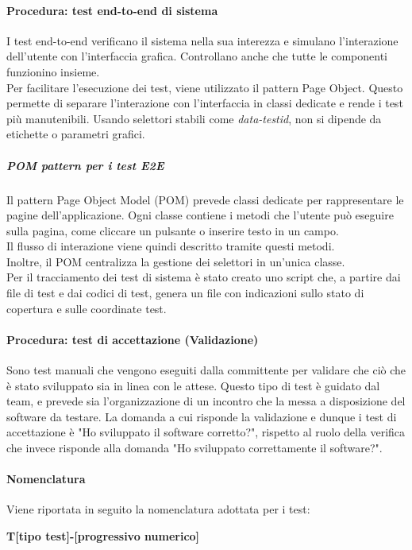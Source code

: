 \documentclass[a4paper,12pt]{article}
\begin{document}
\paragraph{Procedura: test end-to-end di sistema}
I test end-to-end verificano il sistema nella sua interezza e simulano l'interazione dell'utente con l'interfaccia grafica. Controllano anche che tutte le componenti funzionino insieme.\\
Per facilitare l'esecuzione dei test, viene utilizzato il pattern Page Object. Questo permette di separare l'interazione con l'interfaccia in classi dedicate e rende i test più manutenibili.
Usando selettori stabili come \textit{data-testid}, non si dipende da etichette o parametri grafici.
\subparagraph{POM pattern per i test E2E}
Il pattern Page Object Model (POM) prevede classi dedicate per rappresentare le pagine dell'applicazione. 
Ogni classe contiene i metodi che l'utente può eseguire sulla pagina, come cliccare un pulsante o inserire testo in un campo.\\
Il flusso di interazione viene quindi descritto tramite questi metodi.\\
Inoltre, il POM centralizza la gestione dei selettori in un'unica classe.
\\ Per il tracciamento dei test di sistema è stato creato uno script che, a partire dai file di test e dai codici di test, genera un file con indicazioni sullo stato di copertura e sulle coordinate test.

\paragraph{Procedura: test di accettazione (Validazione)}
Sono test manuali che vengono eseguiti dalla committente per validare che ciò che è stato sviluppato sia in linea con le attese. Questo tipo di test è guidato dal team, e prevede sia l'organizzazione di un incontro che la messa a disposizione del software da testare. La domanda a cui risponde la validazione e dunque i test di accettazione è "Ho sviluppato il software corretto?", rispetto al ruolo della verifica che invece risponde alla domanda "Ho sviluppato correttamente il software?".

\paragraph{Nomenclatura}
Viene riportata in seguito la nomenclatura adottata per i test:
\begin{center}
    \textbf{T[tipo test]-[progressivo numerico]}
\end{center}
\end{document}
